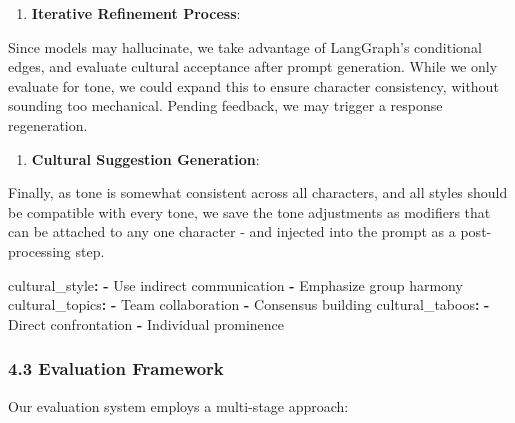 \documentclass[
]{article}
\newenvironment{Shaded}{}{}
\newcommand{\AttributeTok}[1]{\textcolor[rgb]{0.49,0.56,0.16}{#1}}
\newcommand{\FunctionTok}[1]{\textcolor[rgb]{0.02,0.16,0.49}{#1}}
\newcommand{\KeywordTok}[1]{\textcolor[rgb]{0.00,0.44,0.13}{\textbf{#1}}}
\providecommand{\tightlist}{%
  \setlength{\itemsep}{0pt}\setlength{\parskip}{0pt}}
\begin{document}
\begin{enumerate}
\def\labelenumi{\arabic{enumi}.}
\setcounter{enumi}{2}
\tightlist
\item
  \textbf{Iterative Refinement Process}:
\end{enumerate}

Since models may hallucinate, we take advantage of LangGraph's conditional edges, and evaluate cultural acceptance after prompt generation. While we only evaluate for tone, we could expand this to ensure character consistency, without sounding too mechanical. Pending feedback, we may trigger a response regeneration.

\begin{enumerate}
\def\labelenumi{\arabic{enumi}.}
\setcounter{enumi}{3}
\tightlist
\item
  \textbf{Cultural Suggestion Generation}:
\end{enumerate}

Finally, as tone is somewhat consistent across all characters, and all styles should be compatible with every tone, we save the tone adjustments as modifiers that can be attached to any one character - and injected into the prompt as a post-processing step. 

\begin{Shaded}
\begin{Highlighting}[]
\FunctionTok{cultural\_style}\KeywordTok{:}
\AttributeTok{  }\KeywordTok{{-}}\AttributeTok{ Use indirect communication}
\AttributeTok{  }\KeywordTok{{-}}\AttributeTok{ Emphasize group harmony}
\FunctionTok{cultural\_topics}\KeywordTok{:}
\AttributeTok{  }\KeywordTok{{-}}\AttributeTok{ Team collaboration}
\AttributeTok{  }\KeywordTok{{-}}\AttributeTok{ Consensus building}
\FunctionTok{cultural\_taboos}\KeywordTok{:}
\AttributeTok{  }\KeywordTok{{-}}\AttributeTok{ Direct confrontation}
\AttributeTok{  }\KeywordTok{{-}}\AttributeTok{ Individual prominence}
\end{Highlighting}
\end{Shaded}

\subsubsection{4.3 Evaluation Framework}\label{evaluation-framework}

Our evaluation system employs a multi-stage approach:
\end{document}
